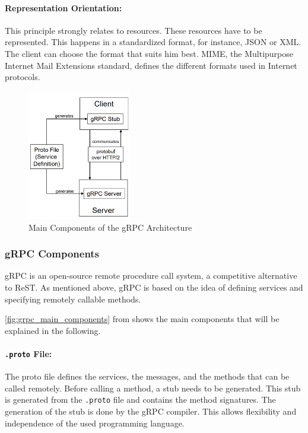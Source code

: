 \paragraph*{Representation Orientation:}
This principle strongly relates to resources.
These resources have to be represented.
This happens in a standardized format, for instance, JSON or XML.
The client can choose the format that suits him best.
MIME, the Multipurpose Internet Mail Extensions standard, defines the different formats used in Internet protocols.

\begin{figure}
    \centering
    \includegraphics[width=0.4\textwidth]{figures/microservices/microservices_grpcMainComponents.png}
    \caption{Main Components of the gRPC Architecture}
    \label{fig:grpc_main_components}
\end{figure}

\subsubsection*{gRPC Components}
gRPC is an open-source remote procedure call system, a competitive alternative to ReST.
As mentioned above, gRPC is based on the idea of defining services and specifying remotely callable methods.

\autoref{fig:grpc_main_components} from \cite{CM-T-DES} shows the main components that will be explained in the following.

\paragraph*{\texttt{.proto} File:}
The proto file defines the services, the messages, and the methods that can be called remotely.
Before calling a method, a stub needs to be generated.
This stub is generated from the \texttt{.proto} file and contains the method signatures.
The generation of the stub is done by the gRPC compiler.
This allows flexibility and independence of the used programming language.

